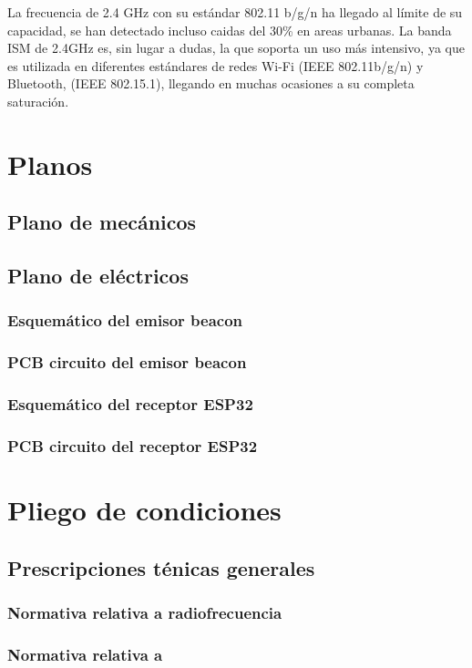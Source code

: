 \documentclass[a4paper ,12pt, onecolumn]{article}
\begin{document}
            La frecuencia de 2.4 GHz con su estándar 802.11 b/g/n ha llegado al límite de su capacidad, se han
            detectado incluso caidas del 30\% en areas urbanas.  
            La banda ISM de 2.4GHz es, sin lugar a dudas, la que soporta un uso más intensivo, ya que es utilizada en 
            diferentes estándares de redes Wi-Fi (IEEE 802.11b/g/n) y Bluetooth, (IEEE 802.15.1), llegando en muchas 
            ocasiones a su completa saturación.
\section{Planos}
    \subsection{Plano de mecánicos}
    \subsection{Plano de eléctricos}
        \subsubsection{Esquemático del emisor beacon}
        \subsubsection{PCB circuito del emisor beacon}
        \subsubsection{Esquemático del receptor ESP32}
        \subsubsection{PCB circuito del receptor ESP32}
\section{Pliego de condiciones}
    \subsection{Prescripciones ténicas generales}
        \subsubsection{Normativa relativa a radiofrecuencia}
        \subsubsection{Normativa relativa a }
\end{document}
